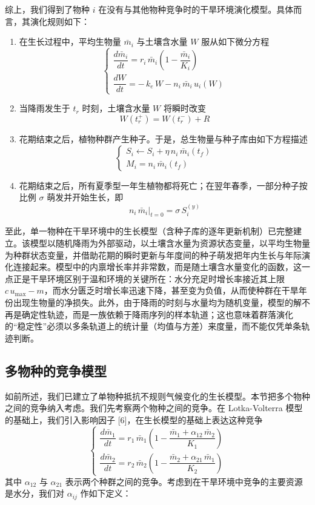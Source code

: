 \documentclass[11pt,a4paper]{ctexart}
\begin{document}
综上，我们得到了物种 $i$ 在没有与其他物种竞争时的干旱环境演化模型。具体而言，其演化规则如下：

\begin{enumerate}
\item[(i)] 在生长过程中，平均生物量 $\bar m_i$ 与土壤含水量 $W$ 服从如下微分方程
\[
\begin{cases}
\dfrac{d\bar m_i}{dt}=r_i\,\bar m_i\left(1-\dfrac{\bar m_i}{K_i}\right)\\[1.0em]
\dfrac{dW}{dt}=-\,k_e\,W-n_i\,\bar m_i\,u_i(W)
\end{cases}
\]
\item[(ii)] 当降雨发生于 $t_r$ 时刻，土壤含水量 $W$ 将瞬时改变
\[
W\left(t_r^{+}\right)=W\left(t_r^{-}\right)+R
\]
\item[(iii)] 花期结束之后，植物种群产生种子。于是，总生物量与种子库由如下方程描述
\[
\begin{cases}
S_i\leftarrow S_i+\eta\,n_i\,\bar m_i\left(t_f\right)\\[0.6em]
M_i=n_i\,\bar m_i\left(t_f\right)
\end{cases}
\]
\item[(iv)] 花期结束之后，所有夏季型一年生植物都将死亡；在翌年春季，一部分种子按比例 $\sigma$ 萌发并开始生长，即
\[
n_i\,\bar m_i\big|_{t=0}=\sigma\,S_i^{(y)}
\]
\end{enumerate}

至此，单一物种在干旱环境中的生长模型（含种子库的逐年更新机制）已完整建立。该模型以随机降雨为外部驱动，以土壤含水量为资源状态变量，以平均生物量为种群状态变量，并借助花期的瞬时更新与年度间的种子萌发把年内生长与年际演化连接起来。模型中的内禀增长率并非常数，而是随土壤含水量变化的函数，这一点正是干旱环境区别于温和环境的关键所在：水分充足时增长率接近其上限 $c\,u_{\max}-m$，而水分匮乏时增长率迅速下降，甚至变为负值，从而使种群在干旱年份出现生物量的净损失。此外，由于降雨的时刻与水量均为随机变量，模型的解不再是确定性轨迹，而是一族依赖于降雨序列的样本轨道；这也意味着群落演化的“稳定性”必须以多条轨道上的统计量（均值与方差）来度量，而不能仅凭单条轨迹判断。
\subsection{多物种的竞争模型}

如前所述，我们已建立了单物种抵抗不规则气候变化的生长模型。本节把多个物种之间的竞争纳入考虑。我们先考察两个物种之间的竞争。在 Lotka-Volterra 模型的基础上，我们引入影响因子 [6]，在生长模型的基础上表达这种竞争
\[
\begin{cases}
\dfrac{d\bar m_1}{dt}=r_1\,\bar m_1\left(1-\dfrac{\bar m_1+\alpha_{12}\,\bar m_2}{K_1}\right)\\[1.0em]
\dfrac{d\bar m_2}{dt}=r_2\,\bar m_2\left(1-\dfrac{\bar m_2+\alpha_{21}\,\bar m_1}{K_2}\right)
\end{cases}
\]
其中 $\alpha_{12}$ 与 $\alpha_{21}$ 表示两个种群之间的竞争。考虑到在干旱环境中竞争的主要资源是水分，我们对 $\alpha_{ij}$ 作如下定义：
\end{document}
